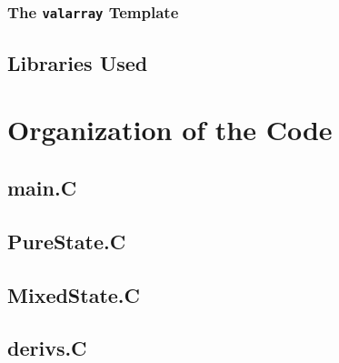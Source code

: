 \subsubsection{The \texttt{valarray} Template}


\subsection{Libraries Used}




\section{Organization of the Code}

\subsection{main.C}



\subsection{PureState.C}


\subsection{MixedState.C}


\subsection{derivs.C}

